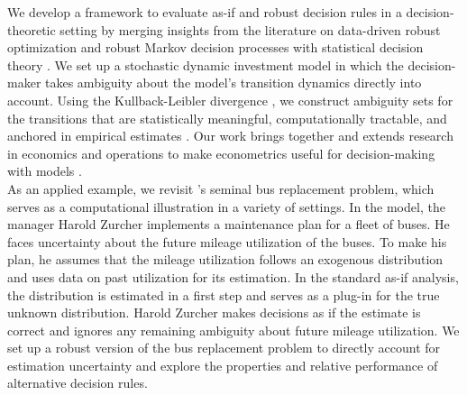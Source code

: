 {We develop a framework to evaluate as-if and robust decision rules in a decision-theoretic setting by merging insights from the literature on data-driven robust optimization \cite{Bertsimas.2018} and robust Markov decision processes \cite{Ben-Tal.2009} with statistical decision theory \cite{Berger.2010}. We set up a stochastic dynamic investment model in which the decision-maker takes ambiguity about the model's transition dynamics directly into account. Using the Kullback-Leibler divergence \cite{Kullback.1951}, we construct ambiguity sets for the transitions that are statistically meaningful, computationally tractable, and anchored in empirical estimates \cite{Ben-Tal.2013}. Our work brings together and extends research in economics and operations to make econometrics useful for decision-making with models \cite{Manski.2021,Bertsimas.2006}.\\

As an applied example, we revisit \cite{Rust.1987}'s seminal bus replacement problem, which serves as a computational illustration in a variety of settings. In the model, the manager Harold Zurcher implements a maintenance plan for a fleet of buses. He faces uncertainty about the future mileage utilization of the buses. To make his plan, he assumes that the mileage utilization follows an exogenous distribution and uses data on past utilization for its estimation. In the standard as-if analysis, the distribution is estimated in a first step and serves as a plug-in for the true unknown distribution. Harold Zurcher makes decisions as if the estimate is correct and ignores any remaining ambiguity about future mileage utilization. We set up a robust version of the bus replacement problem to directly account for estimation uncertainty and explore the properties and relative performance of alternative decision rules.\\


}
